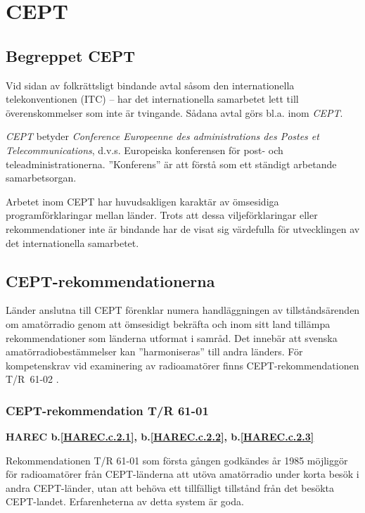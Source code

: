
\section{CEPT}

\subsection{Begreppet CEPT}

Vid sidan av folkrättsligt bindande avtal såsom den internationella
telekonventionen (ITC) -- har det internationella samarbetet lett till
överenskommelser som inte är tvingande.
Sådana avtal görs bl.a. inom \emph{CEPT}.

\emph{CEPT} betyder \emph{Conference Europeenne des administrations des
	Postes et Telecommunications}, d.v.s. Europeiska konferensen
för post- och teleadministrationerna. ''Konferens'' är att förstå som
ett ständigt arbetande samarbetsorgan.

Arbetet inom CEPT har huvudsakligen karaktär av ömsesidiga programförklaringar
mellan länder.
Trots att dessa viljeförklaringar eller rekommendationer inte är bindande har de
visat sig värdefulla för utvecklingen av det internationella samarbetet.

\subsection{CEPT-rekommendationerna}

Länder anslutna till CEPT förenklar numera handläggningen av
tillståndsärenden om amatörradio genom att ömsesidigt bekräfta och
inom sitt land tillämpa rekommendationer som länderna utformat i
samråd.
Det innebär att svenska amatörradiobestämmelser kan ''harmoniseras'' till andra
länders.
För kompetenskrav vid examinering av radioamatörer finns CEPT-rekommendationen
T/R~61-02 \cite{TR6102}.

\subsubsection{CEPT-rekommendation T/R 61-01}
\textbf{
HAREC b.\ref{HAREC.c.2.1}\label{myHAREC.c.2.1},
 b.\ref{HAREC.c.2.2}\label{myHAREC.c.2.2},
 b.\ref{HAREC.c.2.3}\label{myHAREC.c.2.3}
}

Rekommendationen T/R 61-01 \cite{TR6101} som första gången godkändes år 1985
möjliggör för radioamatörer från CEPT-länderna att utöva amatörradio under korta
besök i andra CEPT-länder, utan att behöva ett tillfälligt tillstånd från det
besökta CEPT-landet.
Erfarenheterna av detta system är goda.


